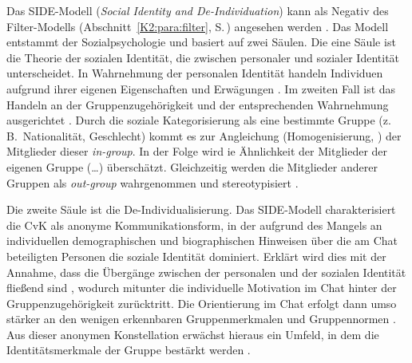 \label{K2:para:side}
\begin{sloppypar}
Das SIDE-Modell (\emph{Social Identity and De-Individuation}) kann als Negativ des Filter-Modells (Abschnitt~\ref{K2:para:filter}, S.\,\pageref{K2:para:filter}) angesehen werden \citep[427]{doring_c_2013}. Das Modell entstammt der Sozialpsychologie und basiert auf zwei Säulen. Die eine Säule ist die Theorie der sozialen Identität, die zwischen personaler und sozialer Identität unterscheidet. In Wahrnehmung der personalen Identität \glqq handeln Individuen aufgrund ihrer eigenen Eigenschaften und Erwägungen\grqq{} \citep[169]{trepte_medienpsychologie_2012}. Im zweiten Fall ist das Handeln an der Gruppenzugehörigkeit und der entsprechenden Wahrnehmung ausgerichtet \citep[169]{trepte_medienpsychologie_2012}. Durch die soziale Kategorisierung als eine bestimmte Gruppe (z.\,B.\ Nationalität, Geschlecht) kommt es zur Angleichung (\glqq Homogenisierung\grqq{}, \cite[169]{trepte_medienpsychologie_2012}) der Mitglieder dieser \emph{in-group}. In der Folge wird \glqq [d]ie Ähnlichkeit der Mitglieder der eigenen Gruppe (\dots) überschätzt. Gleichzeitig werden die Mitglieder anderer Gruppen als \emph{out-group} wahrgenommen und stereotypisiert\grqq{} \citep[169]{trepte_medienpsychologie_2012}.
\end{sloppypar}

Die zweite Säule ist die De-Individualisierung. Das SIDE-Modell charakterisiert die CvK als anonyme Kommunikationsform, in der aufgrund des Mangels an individuellen demographischen und biographischen Hinweisen über die am Chat beteiligten Personen die soziale Identität dominiert. Erklärt wird dies mit der Annahme, dass \glqq die Übergänge zwischen der personalen und der sozialen Identität fließend sind\grqq{} \citep[169]{trepte_medienpsychologie_2012}, wodurch mitunter die individuelle Motivation im Chat hinter der Gruppenzugehörigkeit zurücktritt. Die Orientierung im Chat erfolgt dann \glqq umso stärker an den wenigen erkennbaren Gruppenmerkmalen und Gruppennormen\grqq{} \citep[427]{doring_c_2013}. Aus dieser anonymen Konstellation erwächst hieraus ein Umfeld, in dem die Identitätsmerkmale der Gruppe bestärkt werden \citep[170]{trepte_medienpsychologie_2012}.

